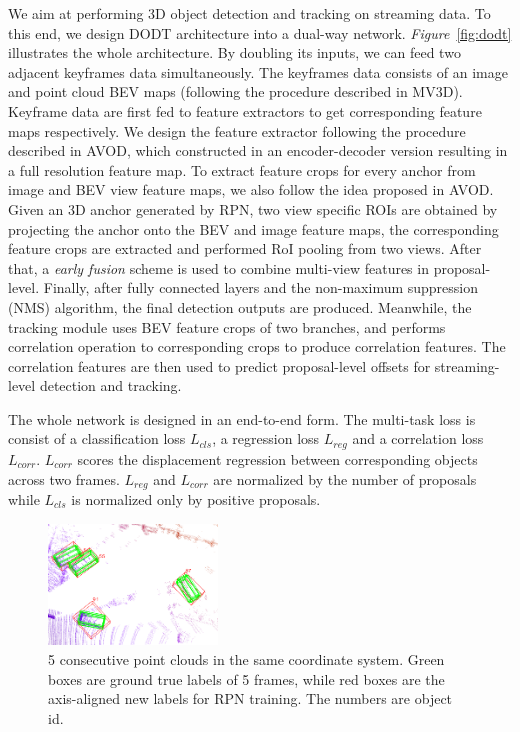 \documentclass[letterpaper, 10 pt, conference]{ieeeconf}  %
\def\figurename{\emph{Figure}}
\begin{document}
We aim at performing 3D object detection and tracking on streaming data. To this end, we design DODT architecture into a dual-way network. \figurename \, \ref{fig:dodt} illustrates the whole architecture. By doubling its inputs, we can feed two adjacent keyframes data simultaneously. The keyframes data consists of an image and point cloud BEV maps (following the procedure described in MV3D\cite{chen2017multi}). Keyframe data are first fed to feature extractors to get corresponding feature maps respectively. We design the feature extractor following the procedure described in AVOD\cite{ku2018joint}, which constructed in an encoder-decoder version resulting in a full resolution feature map. To extract feature crops for every anchor from image and BEV view feature maps, we also follow the idea proposed in AVOD\cite{ku2018joint}. Given an 3D anchor generated by RPN, two view specific ROIs are obtained by projecting the anchor onto the BEV and image feature maps, the corresponding feature crops are extracted and performed RoI pooling from two views. After that, a \textit{early fusion} scheme is used to combine multi-view features in proposal-level. Finally, after fully connected layers and the non-maximum suppression (NMS) algorithm, the final detection outputs are produced. Meanwhile, the tracking module uses BEV feature crops of two branches, and performs correlation operation to corresponding crops to produce correlation features. The correlation features are then used to predict proposal-level offsets for streaming-level detection and tracking.

The whole network is designed in an end-to-end form. The multi-task loss is consist of a classification loss $L_{cls}$, a regression loss $L_{reg}$ and a correlation loss $L_{corr}$. $L_{corr}$ scores the displacement regression between corresponding objects across two frames. $L_{reg}$ and $L_{corr}$ are normalized by the number of proposals while $L_{cls}$ is normalized only by positive proposals.

\begin{figure}
	\vspace{-0.6cm}
	\rule{0pt}{1ex}
	\begin{center}
		\includegraphics[width=0.4\textwidth]{images/integrated_boxes.png}
	\end{center}
	\caption{5 consecutive point clouds in the same coordinate system. Green boxes are ground true labels of 5 frames, while red boxes are the axis-aligned new labels for RPN training. The numbers are object id.}
	\label{fig:integrated_boxes}
	\vspace{-0.5cm}
\end{figure}
\end{document}
